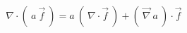 \begin{equation}
\nabla \cdot \left( ~a ~\vec{f} ~\right) =
a ~ \left( ~ \nabla \cdot \vec{f} ~\right) +
\left( ~\vec{\nabla} ~a ~\right) \cdot \vec{f}
\end{equation}
